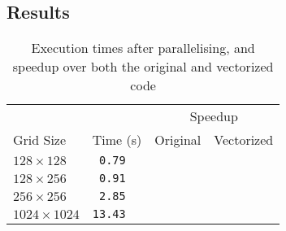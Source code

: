 \documentclass[11pt, twocolumn, a4paper]{article}
\begin{document}
\subsection{Results}

\begin{table}[htbp]
  \begin{center}
  \caption{Execution times after parallelising, and speedup over both the original and vectorized code}\label{tab:parallelised}
  \begin{tabular}{l | l  l  l} 
      \hline\hline
      &&\multicolumn{2}{c}{Speedup}\\
      \cline{3-4}
      Grid Size&Time (s)&Original&Vectorized\\
      \hline
      $128 \times 128$&\texttt{ 0.79}\\
      $128 \times 256$&\texttt{ 0.91}\\
      $256 \times 256$&\texttt{ 2.85}\\
      $1024 \times 1024$&\texttt{13.43}\\
      \hline
    \end{tabular}
  \end{center}
\end{table} 

\clearpage

\onecolumn{
  \printbibliography
}
\end{document}
